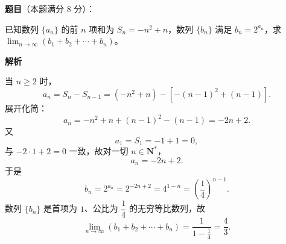 \begin{answer}

\textbf{题目}（本题满分 8 分）：

已知数列 $\{a_n\}$ 的前 $n$ 项和为 $S_n=-n^2+n$，数列 $\{b_n\}$ 满足 $b_n=2^{a_n}$，求 $\displaystyle\lim_{n\to\infty}(b_1+b_2+\cdots+b_n)$。

\textbf{解析}

当 $n\geqslant2$ 时，
\nopagebreak[4]
\[a_n=S_n-S_{n-1}=(-n^2+n)-\left[-(n-1)^2+(n-1)\right].\]
展开化简：
\nopagebreak[4]
\[a_n=-n^2+n+(n-1)^2-(n-1)=-2n+2.\]
又
\nopagebreak[4]
\[a_1=S_1=-1+1=0,\]
与 $-2\cdot1+2=0$ 一致，故对一切 $n\in\mathbf N^*$，
\nopagebreak[4]
\[a_n=-2n+2.\]
于是
\nopagebreak[4]
\[b_n=2^{a_n}=2^{-2n+2}=4^{1-n}=\left(\frac14\right)^{n-1}.\]
数列 $\{b_n\}$ 是首项为 $1$、公比为 $\dfrac14$ 的无穷等比数列，故
\nopagebreak[4]
\[\lim_{n\to\infty}(b_1+b_2+\cdots+b_n)
=\frac{1}{1-\frac14}
=\frac43.\]


\end{answer}

